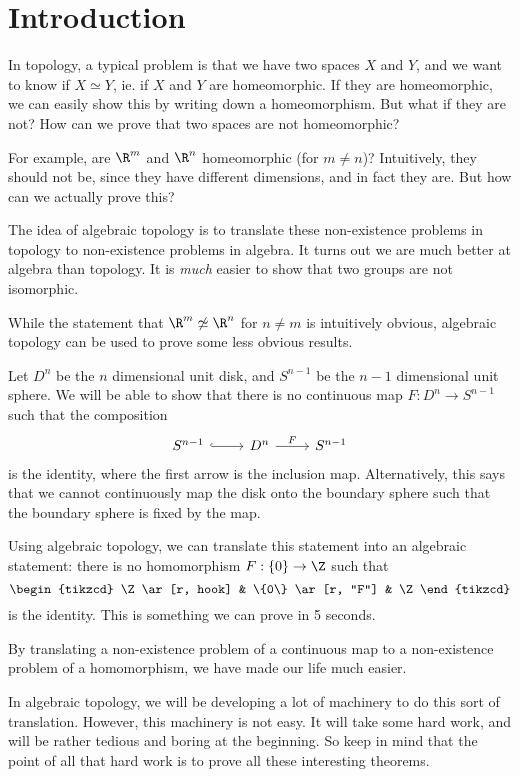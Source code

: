 \documentclass[a4paper]{article}
\begin{document}
\tableofcontents

\setcounter{section}{-1}
\section{Introduction}
In topology, a typical problem is that we have two spaces $X$ and $Y$, and we want to know if $X\simeq Y$, ie. if $X$ and $Y$ are homeomorphic. If they are homeomorphic, we can easily show this by writing down a homeomorphism. But what if they are not? How can we prove that two spaces are not homeomorphic?

For example, are $\R^m$ and $\R^n$ homeomorphic (for $m\not= n$)? Intuitively, they should not be, since they have different dimensions, and in fact they are. But how can we actually prove this?

The idea of algebraic topology is to translate these non-existence problems in topology to non-existence problems in algebra. It turns out we are much better at algebra than topology. It is \emph{much} easier to show that two groups are not isomorphic.

While the statement that $\R^m \not\simeq \R^n$ for $n \not= m$ is intuitively obvious, algebraic topology can be used to prove some less obvious results.

Let $D^n$ be the $n$ dimensional unit disk, and $S^{n - 1}$ be the $n-1$ dimensional unit sphere. We will be able to show that there is no continuous map $F: D^n \to S^{n - 1}$ such that the composition
\[
  \begin{tikzcd}
    S^{n - 1} \ar[r, hook] & D^n \ar[r, "F"] & S^{n - 1}
  \end{tikzcd}
\]
is the identity, where the first arrow is the inclusion map. Alternatively, this says that we cannot continuously map the disk onto the boundary sphere such that the boundary sphere is fixed by the map.

Using algebraic topology, we can translate this statement into an algebraic statement: there is no homomorphism $F: \{0\} \to \Z$ such that
\[
  \begin{tikzcd}
    \Z \ar[r, hook] & \{0\} \ar[r, "F"] & \Z
  \end{tikzcd}
\]
is the identity. This is something we can prove in 5 seconds.

By translating a non-existence problem of a continuous map to a non-existence problem of a homomorphism, we have made our life much easier.

In algebraic topology, we will be developing a lot of machinery to do this sort of translation. However, this machinery is not easy. It will take some hard work, and will be rather tedious and boring at the beginning. So keep in mind that the point of all that hard work is to prove all these interesting theorems.
\end{document}
